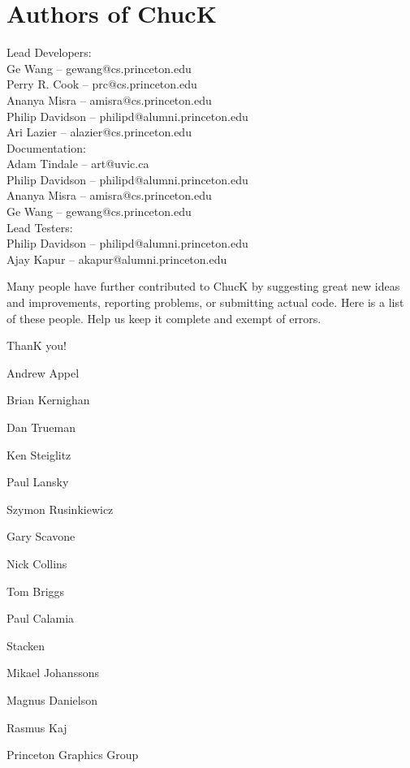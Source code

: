 \newpage
\section{Authors of ChucK}

Lead Developers:\\
\authtab Ge Wang -- gewang@cs.princeton.edu\\
\authtab Perry R. Cook -- prc@cs.princeton.edu\\
\authtab Ananya Misra -- amisra@cs.princeton.edu\\
\authtab Philip Davidson -- philipd@alumni.princeton.edu\\
\authtab Ari Lazier -- alazier@cs.princeton.edu\\

Documentation:\\
\authtab Adam Tindale -- art@uvic.ca\\
\authtab Philip Davidson -- philipd@alumni.princeton.edu\\
\authtab Ananya Misra -- amisra@cs.princeton.edu\\
\authtab Ge Wang -- gewang@cs.princeton.edu\\

Lead Testers:\\
\authtab Philip Davidson -- philipd@alumni.princeton.edu\\
\authtab Ajay Kapur -- akapur@alumni.princeton.edu



Many people have further contributed to ChucK by suggesting great new 
ideas and improvements, reporting problems, or submitting actual code. 
Here is a list of these people.  Help us keep it complete and exempt of 
errors.  

ThanK you!

\begin{chuckitemize}
\item Andrew Appel 
\item Brian Kernighan 
\item Dan Trueman 
\item Ken Steiglitz 
\item Paul Lansky 
\item Szymon Rusinkiewicz 
\item Gary Scavone 
\item Nick Collins 
\item Tom Briggs 
\item Paul Calamia 
\item Stacken 
  \begin{chuckitemize}
  \item Mikael Johanssons 
  \item Magnus Danielson 
  \item Rasmus Kaj 
  \end{chuckitemize}
\item Princeton Graphics Group
\end{chuckitemize}
